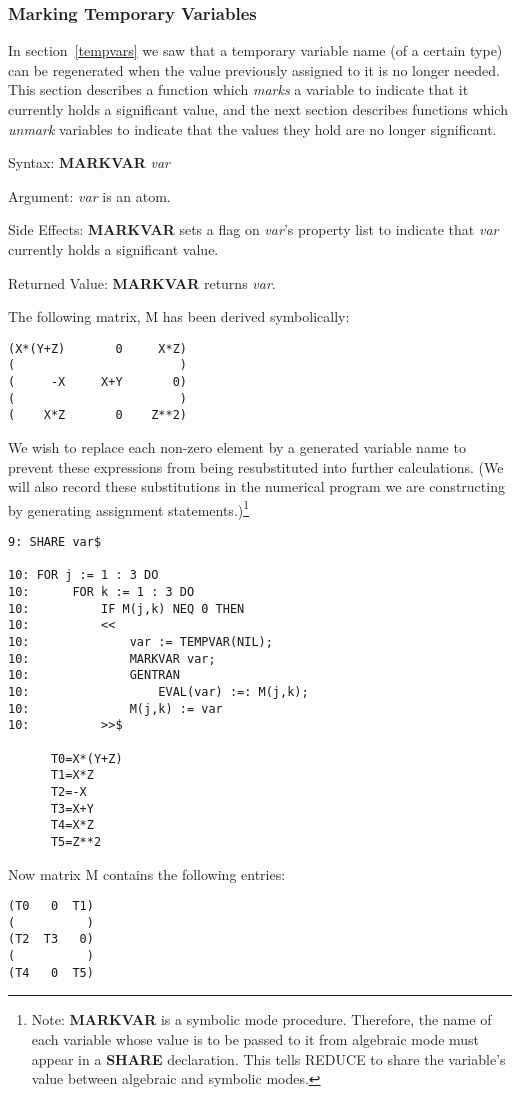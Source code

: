 \subsubsection{Marking Temporary Variables}
In section~\ref{tempvars} we saw that a temporary variable name (of a certain
type) can be regenerated when the value previously assigned to it
is no longer needed.  This section describes a function which {\it marks}
a variable to indicate that it currently holds a
significant value, and the next section describes functions which
{\it unmark} variables to indicate that the values they hold are no
longer significant.
\begin{describe}{Syntax:}
{\bf MARKVAR} {\it  var}
\end{describe}
\begin{describe}{Argument:}
{\it var} is an atom.
\end{describe}
\begin{describe}{Side Effects:}
{\bf MARKVAR} sets a flag on {\it var}'s property list to indicate that
{\it var} currently holds a significant value.
\end{describe}
\begin{describe}{Returned Value:}
{\bf MARKVAR} returns {\it var}.
\end{describe}
\begin{describe}{\example}
The following matrix, M has been derived symbolically:
\begin{verbatim}
(X*(Y+Z)       0     X*Z)
(                       )
(     -X     X+Y       0)
(                       )
(    X*Z       0    Z**2)
\end{verbatim}
We wish to replace each non-zero element by a generated variable name
to prevent these expressions from being resubstituted into further
calculations.  (We will also record these substitutions in the
numerical program we are constructing by generating assignment
statements.)\footnote{ Note: {\bf MARKVAR} is a symbolic mode
procedure.  Therefore, the name of each variable whose value is to be
passed to it from algebraic mode must appear in a {\bf SHARE}
 declaration.  This tells REDUCE to share the
variable's value between algebraic and symbolic modes.}
\begin{verbatim}
9: SHARE var$ 

10: FOR j := 1 : 3 DO 
10:      FOR k := 1 : 3 DO 
10:          IF M(j,k) NEQ 0 THEN 
10:          << 
10:              var := TEMPVAR(NIL); 
10:              MARKVAR var;
10:              GENTRAN
10:                  EVAL(var) :=: M(j,k);
10:              M(j,k) := var
10:          >>$ 

      T0=X*(Y+Z)
      T1=X*Z
      T2=-X
      T3=X+Y
      T4=X*Z
      T5=Z**2
\end{verbatim}
Now matrix M contains the following entries:
\begin{verbatim}
(T0   0  T1)
(          )
(T2  T3   0)
(          )
(T4   0  T5)
\end{verbatim}
\end{describe}

